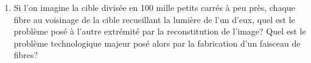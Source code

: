 \begin{exercice}
\begin{enumerate}
    \item Si l'on imagine la cible divisée en 100 mille petits carrés à peu 
      près, chaque fibre au voisinage de la cible recueillant la lumière de 
      l'un d'eux, quel est le problème posé à l'autre extrémité par la 
      reconstitution de l'image? Quel est le problème technologique majeur 
      posé alors par la fabrication d'un faisceau de fibres?
  \end{enumerate}
\end{exercice}%
